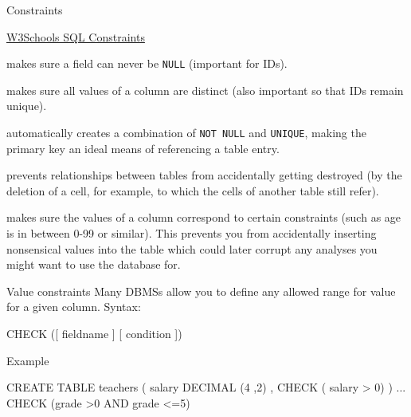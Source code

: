 \begin{frame}{Constraints}
\footnotesize

\begin{alertblock}{\href{https://www.w3schools.com/sql/sql_constraints.asp}{W3Schools SQL Constraints}}
  \begin{description}\footnotesize 
      \item[NOT NULL] makes sure a field can never be \texttt{NULL} (important for IDs). 
      \item[UNIQUE] makes sure all values of a column are distinct (also important so that IDs remain unique). 
      \item[PRIMARY KEY] automatically creates a combination of \texttt{NOT NULL} and \texttt{UNIQUE}, making the primary key an ideal means of referencing a table entry. 
      \item[FOREIGN KEY] prevents relationships between tables from accidentally getting destroyed (by the deletion of a cell, for example, to which the cells of another table still refer).
      \item[CHECK] makes sure the values of a column correspond to certain constraints (such as age is in between 0-99 or similar). This prevents you from accidentally inserting nonsensical values into the table which could later corrupt any analyses you might want to use the database for. 
  \end{description}
\end{alertblock}


\begin{alertblock}{Value constraints}
  Many DBMSs allow you to define any allowed range for value for a given column. Syntax:
\begin{sqlcode}
CHECK ([ fieldname ] [ condition ])
\end{sqlcode}

Example
\begin{sqlcode}
CREATE TABLE teachers (
salary DECIMAL (4 ,2) ,
CHECK ( salary > 0)
)
...
CHECK (grade >0 AND grade <=5)
\end{sqlcode}
\end{alertblock}

\end{frame}





